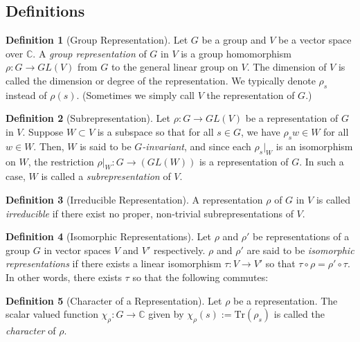 \documentclass{article}
\theoremstyle{definition}
\newtheorem{definition}{Definition}[subsection]
\begin{document}
\subsection{Definitions}
\begin{definition}[Group Representation]
    Let $G$ be a group and $V$ be a vector space over $\mathbb{C}$. A \textit{group representation} of $G$ in $V$ is a group homomorphism $\rho:G\rightarrow GL(V)$ from $G$ to the general linear group on $V$. The dimension of $V$ is called the dimension or degree of the representation. We typically denote $\rho_s$ instead of $\rho(s)$. (Sometimes we simply call $V$ the representation of $G$.)
\end{definition}
\begin{definition}[Subrepresentation]
    Let $\rho:G\rightarrow GL(V)$ be a representation of $G$ in $V$. Suppose $W\subset V$ is a subspace so that for all $s\in G$, we have $\rho_s w\in W$ for all $w\in W$. Then, $W$ is said to be $G$\textit{-invariant}, and since each $\rho_s|_W$ is an isomorphism on $W$, the restriction $\rho|_W:G\rightarrow(GL(W))$ is a representation of $G$. In such a case, $W$ is called a \textit{subrepresentation} of $V$.
\end{definition}
\begin{definition}[Irreducible Representation]
    A representation $\rho$ of $G$ in $V$ is called \textit{irreducible} if there exist no proper, non-trivial subrepresentations of $V$.
\end{definition}
\begin{definition}[Isomorphic Representations]
    Let $\rho$ and $\rho '$ be representations of a group $G$ in vector spaces $V$ and $V'$ respectively. $\rho$ and $\rho '$ are said to be \textit{isomorphic representations} if there exists a linear isomorphism $\tau: V\rightarrow V'$ so that $\tau\circ \rho = \rho ' \circ \tau$. In other words, there exists $\tau$ so that the following commutes:
    \begin{center}
\end{center}
\end{definition}
\begin{definition}[Character of a Representation]
    Let $\rho$ be a representation. The scalar valued function $\chi_\rho:G\rightarrow \mathbb{C}$ given by $\chi_\rho(s):=\text{Tr}(\rho_s)$ is called the \textit{character} of $\rho$.
\end{definition}
\end{document}
